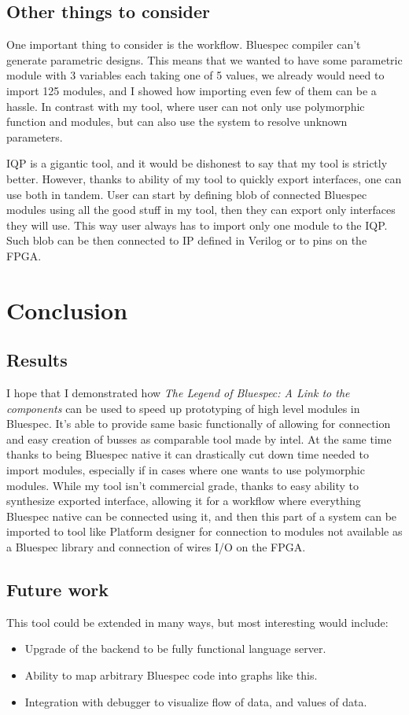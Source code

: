 \documentclass[12pt]{report}
\begin{document}
\section{Other things to consider}
One important thing to consider is the workflow. Bluespec compiler can't generate parametric designs. This means that we wanted to have some parametric module with 3 variables each taking one of 5 values, we already would need to import 125 modules, and I showed how importing even few of them can be a hassle. In contrast with my tool, where user can not only use polymorphic function and modules, but can also use the system to resolve unknown parameters.
\par
IQP is a gigantic tool, and it would be dishonest to say that my tool is strictly better. However, thanks to ability of my tool to quickly export interfaces, one can use both in tandem. User can start by defining blob of connected Bluespec modules using all the good stuff in my tool, then they can export only interfaces they will use. This way user always has to import only one module to the IQP. Such blob can be then connected to IP defined in Verilog or to pins on the FPGA. 
\chapter{Conclusion}
\section{Results}
I hope that I demonstrated how \emph{The Legend of Bluespec: A Link to the components} can be used to speed up prototyping of high level modules in Bluespec. It's able to provide same basic functionally of allowing for connection and easy creation of busses as comparable tool made by intel. At the same time thanks to being Bluespec native it can drastically cut down time needed to import modules, especially if in cases where one wants to use polymorphic modules. While my tool isn't commercial grade, thanks to easy ability to synthesize exported interface, allowing it for a workflow where everything Bluespec native can be connected using it, and then this part of a system can be imported to tool like Platform designer for connection to modules not available as a Bluespec library and connection of wires I/O on the FPGA.
\section{Future work}
This tool could be extended in many ways, but most interesting would include:
\begin{itemize}
    \item Upgrade of the backend to be fully functional language server.
    \item Ability to map arbitrary Bluespec code into graphs like this.
    \item Integration with debugger to visualize flow of data, and values of data.
\end{itemize}
\end{document}

